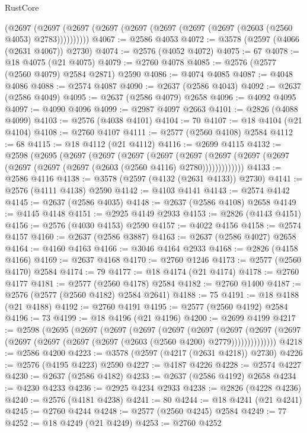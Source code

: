 \begin{lexlean}{RustCore}
\begin{coremodule}
      (@2697 (@2697 (@2697 (@2697 (@2697 (@2697 (@2697 (@2697 (@2603 (@2560 @4053) @2783))))))))))
@4067 := @2586 @4053
@4072 := @3578 (@2597 (@4066 (@2631 @4067)) @2730)
@4074 := @2576 (@4052 @4072)
@4075 := 67
@4078 := @18 @4075 (@21 @4075)
@4079 := @2760 @4078
@4085 := @2576 (@2577 (@2560 @4079) @2584 @2871) @2590
@4086 := @4074 @4085
@4087 := @4048 @4086
@4088 := @2574 @4087
@4090 := @2637 (@2586 @4043)
@4092 := @2637 (@2586 @4049)
@4095 := @2637 (@2586 @4079) @2658
@4096 := @4092 @4095
@4097 := @4090 @4096
@4099 := @2987 @4097 @2663
@4101 := @2826 (@4088 @4099)
@4103 := @2576 (@4038 @4101)
@4104 := 70
@4107 := @18 @4104 (@21 @4104)
@4108 := @2760 @4107
@4111 := @2577 (@2560 @4108) @2584
@4112 := 68
@4115 := @18 @4112 (@21 @4112)
@4116 := @2699 @4115
@4132 := @2598
    (@2695
      (@2697
        (@2697
          (@2697
            (@2697
              (@2697
                (@2697 (@2697 (@2697 (@2697 (@2697 (@2697 (@2603 (@2560 @4116) @2780)))))))))))))
@4133 := @2586 @4116
@4138 := @3578 (@2597 (@4132 (@2631 @4133)) @2730)
@4141 := @2576 (@4111 @4138) @2590
@4142 := @4103 @4141
@4143 := @2574 @4142
@4145 := @2637 (@2586 @4035)
@4148 := @2637 (@2586 @4108) @2658
@4149 := @4145 @4148
@4151 := @2925 @4149 @2933
@4153 := @2826 (@4143 @4151)
@4156 := @2576 (@4030 @4153) @2590
@4157 := @4022 @4156
@4158 := @2574 @4157
@4160 := @2637 (@2586 @3887)
@4163 := @2637 (@2586 @4027) @2658
@4164 := @4160 @4163
@4166 := @3046 @4164 @2933
@4168 := @2826 (@4158 @4166)
@4169 := @2637 @4168
@4170 := @2760 @1246
@4173 := @2577 (@2560 @4170) @2584
@4174 := 79
@4177 := @18 @4174 (@21 @4174)
@4178 := @2760 @4177
@4181 := @2577 (@2560 @4178) @2584
@4182 := @2760 @1400
@4187 := @2576 (@2577 (@2560 @4182) @2584 @2641)
@4188 := 75
@4191 := @18 @4188 (@21 @4188)
@4192 := @2760 @4191
@4195 := @2577 (@2560 @4192) @2584
@4196 := 73
@4199 := @18 @4196 (@21 @4196)
@4200 := @2699 @4199
@4217 := @2598
    (@2695
      (@2697
        (@2697
          (@2697
            (@2697
              (@2697
                (@2697
                  (@2697 (@2697 (@2697 (@2697 (@2697 (@2697 (@2603 (@2560 @4200) @2779))))))))))))))
@4218 := @2586 @4200
@4223 := @3578 (@2597 (@4217 (@2631 @4218)) @2730)
@4226 := @2576 (@4195 @4223) @2590
@4227 := @4187 @4226
@4228 := @2574 @4227
@4230 := @2637 (@2586 @4182)
@4233 := @2637 (@2586 @4192) @2658
@4234 := @4230 @4233
@4236 := @2925 @4234 @2933
@4238 := @2826 (@4228 @4236)
@4240 := @2576 (@4181 @4238)
@4241 := 80
@4244 := @18 @4241 (@21 @4241)
@4245 := @2760 @4244
@4248 := @2577 (@2560 @4245) @2584
@4249 := 77
@4252 := @18 @4249 (@21 @4249)
@4253 := @2760 @4252

\end{coremodule}
\end{lexlean}
